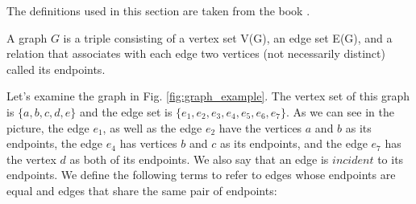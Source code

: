 The definitions used in this section are taken from the book \cite{Wes01}.

\begin{definition}
\label{def:graph}
A graph $G$ is a triple consisting of a vertex set V(G), an edge set E(G), and a relation that associates with each edge two vertices (not necessarily distinct) called its endpoints.
\end{definition}

Let's examine the graph in Fig. \ref{fig:graph_example}. The vertex set of this graph is $\{a, b, c, d, e\}$ and the edge set is $\{e_1, e_2, e_3, e_4,e_5, e_6, e_7\}$. As we can see in the picture, the edge $e_1$, as well as the edge $e_2$ have the vertices $a$ and $b$ as its endpoints, the edge $e_4$ has vertices $b$ and $c$ as its endpoints, and the edge $e_7$ has the vertex $d$ as both of its endpoints. We also say that an edge is $incident$ to its endpoints. We define the following terms to refer to edges whose endpoints are equal and edges that share the same pair of endpoints:

